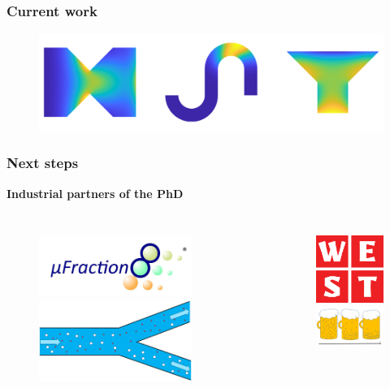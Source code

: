 \documentclass[aspectratio=169,xcolor=dvipsnames]{beamer}
\begin{document}
\begin{frame}
	\frametitle{Current work}
	\begin{figure}
		\includegraphics[width=15cm]{Future.png}
	\end{figure}
\end{frame}
\begin{frame}
	\frametitle{Next steps}
	\textbf{Industrial partners of the PhD}
	\begin{columns}
		\begin{figure}
			\includegraphics[width=5cm]{ufraction8.png}
			\includegraphics[width=5cm]{Microfilter.png}
		\end{figure}
		
		\begin{figure}
			\includegraphics[width=3cm]{west.png}\\
			\includegraphics[width=3.5cm]{beer.png}
		\end{figure}
	\end{columns}
\end{frame}
\end{document}
